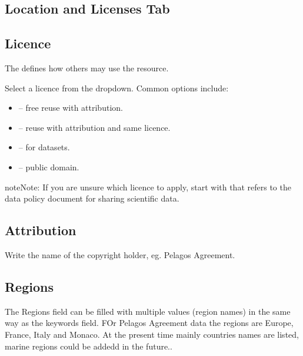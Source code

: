 \documentclass[letterpaper,10pt,english]{sphinxmanual}
\begin{document}
\subsection{Location and Licenses Tab}
\label{\detokenize{03_managing_metadata:location-and-licenses-tab}}

\subsection{Licence}
\label{\detokenize{03_managing_metadata:licence}}
\sphinxAtStartPar
The  defines how others may use the resource.

\sphinxAtStartPar
Select a licence from the dropdown. Common options include:
\begin{itemize}
\item {} 
\sphinxAtStartPar
{} – free reuse with attribution.

\item {} 
\sphinxAtStartPar
{} – reuse with attribution and
same licence.

\item {} 
\sphinxAtStartPar
{} – for datasets.

\item {} 
\sphinxAtStartPar
{} – public domain.

\end{itemize}

\begin{sphinxadmonition}{note}{Note:}
\sphinxAtStartPar
If you are unsure which licence to apply, start with 
that refers to the data policy document for sharing scientific data.
\end{sphinxadmonition}


\subsection{Attribution}
\label{\detokenize{03_managing_metadata:attribution}}
\sphinxAtStartPar
Write the name of the copyright holder, eg. Pelagos Agreement.


\subsection{Regions}
\label{\detokenize{03_managing_metadata:regions}}
\sphinxAtStartPar
The Regions field can be filled with multiple values (region names) in the same way as the keywords field.
FOr Pelagos Agreement data  the regions are Europe, France, Italy and Monaco.
At the present time mainly countries names are listed, marine regions could be addedd in the future..
\end{document}
